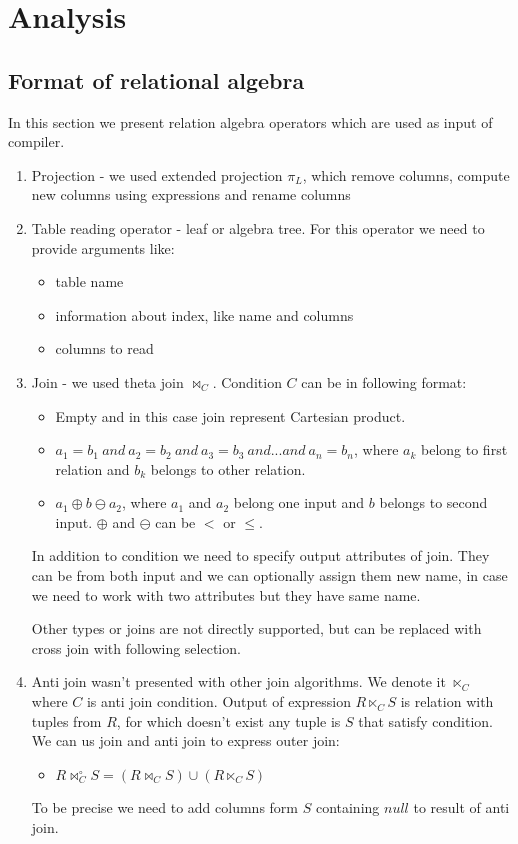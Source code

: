 \chapter{Analysis}

\section{Format of relational algebra}

In this section we present relation algebra operators which are used as input of compiler.
\begin{enumerate}
\item Projection - we used extended projection $\pi_L$, which remove columns, compute new columns using expressions and rename columns

\item Table reading operator - leaf or algebra tree. For this operator we need to provide arguments like:
\begin{itemize}
\item table name
\item information about index, like name and columns
\item columns to read
\end{itemize}
\item Join - we used theta join $\Join_C$. Condition $C$ can be in following format:
\begin{itemize}
\item Empty and in this case join represent Cartesian product.
\item $a_1=b_1~and~a_2=b_2~and~a_3=b_3~and...and~a_n=b_n$, where $a_k$ belong to first relation and $b_k$ belongs to other relation.
\item $a_1\oplus b \ominus a_2$, where $a_1$ and $a_2$ belong one input and $b$ belongs to second input. $\oplus$ and $\ominus$ can be $<$ or $\leq$.

\end{itemize}

In addition to condition we need to specify output attributes of join. They can be from both input and we can optionally assign them new name, in case we need to work with two attributes but they have same name.

Other types or joins are not directly supported, but can be replaced with cross join with following selection.
\item Anti join wasn't presented with other join algorithms. We denote it $\ltimes_C$ where $C$ is anti join condition. Output of expression $R \ltimes_C S$ is relation with tuples from $R$, for which doesn't exist any tuple is $S$ that satisfy condition. We can us join and anti join to express outer join:
\begin{itemize}
\item 
 $R\Join^\circ_C S= (R\Join_C S)\cup (R\ltimes_C S)$
\end{itemize}
To be precise we need to add columns form $S$ containing $null$ to result of anti join.
 

\end{enumerate}
